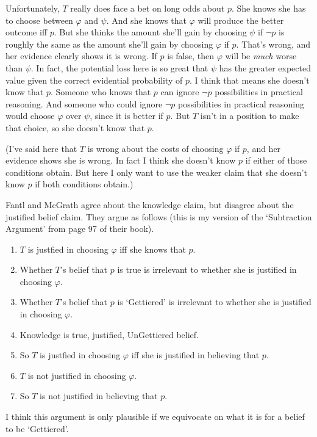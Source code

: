 Unfortunately, $T$ really does face a bet on long odds about $p$. She knows she has to choose between $\varphi$ and $\psi$. And she knows that $\varphi$ will produce the better outcome iff $p$. But she thinks the amount she'll gain by choosing $\psi$ if $\neg p$ is roughly the same as the amount she'll gain by choosing $\varphi$ if $p$. That's wrong, and her evidence clearly shows it is wrong. If $p$ is false, then $\varphi$ will be \textit{much} worse than $\psi$. In fact, the potential loss here is so great that $\psi$ has the greater expected value given the correct evidential probability of $p$. I think that means she doesn't know that $p$. Someone who knows that $p$ can ignore $\neg p$ possibilities in practical reasoning. And someone who could ignore $\neg p$ possibilities in practical reasoning would choose $\varphi$ over $\psi$, since it is better if $p$. But $T$ isn't in a position to make that choice, so she doesn't know that $p$.

(I've said here that $T$ is wrong about the costs of choosing $\varphi$ if $p$, and her evidence shows she is wrong. In fact I think she doesn't know $p$ if either of those conditions obtain. But here I only want to use the weaker claim that she doesn't know $p$ if both conditions obtain.)

Fantl and McGrath agree about the knowledge claim, but disagree about the justified belief claim. They argue as follows (this is my version of the `Subtraction Argument' from page 97 of their book).

\begin{enumerate}
\item $T$ is justfied in choosing $\varphi$ iff she knows that $p$.
\item Whether $T$'s belief that $p$ is true is irrelevant to whether she is justified in choosing $\varphi$.
\item Whether $T$'s belief that $p$ is `Gettiered' is irrelevant to whether she is justified in choosing $\varphi$.
\item Knowledge is true, justified, UnGettiered belief.
\item So $T$ is justfied in choosing $\varphi$ iff she is justified in believing that $p$.
\item $T$ is not justified in choosing $\varphi$.
\item So $T$ is not justified in believing that $p$.
\end{enumerate}

\noindent I think this argument is only plausible if we equivocate on what it is for a belief to be `Gettiered'.

